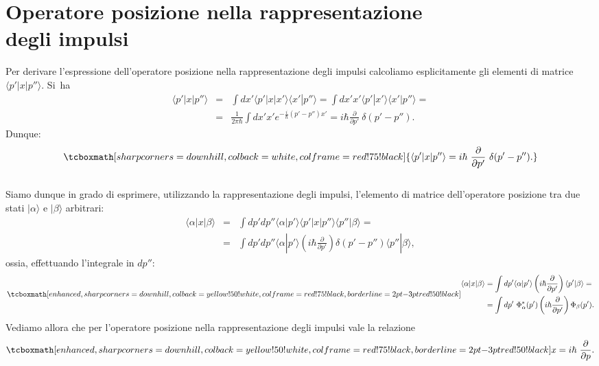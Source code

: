 \documentclass[a4paper,12pt,oneside]{book}
\begin{document}
\section[Operatore posizione nella rappresentazione degli impulsi]{Operatore posizione nella rappresentazione\\degli impulsi}
Per derivare l'espressione dell'operatore posizione nella rappresentazione degli impulsi calcoliamo esplicitamente gli elementi di matrice $\langle p' | x | p'' \rangle$. Si~ha
	\begin{eqnarray}
		\langle p' | x | p'' \rangle &=& \int dx' \langle p' | x | x' \rangle \langle x' | p'' \rangle =  \int dx' x' \langle p' | x' \rangle \langle x' | p'' \rangle = \nonumber\\
		&=& \frac{1}{2 \pi \hbar} \int dx' x' e^{-\frac{i}{\hbar} (p'-p'') x'} =   i \hbar \frac{\partial}{\partial p'} ~\delta(p' - p'').
	\end{eqnarray}
Dunque:
	\begin{equation}
		\tcboxmath[sharp corners=downhill ,colback=white,colframe=red!75!black]{		
			\langle p' | x | p'' \rangle = i \hbar~ \frac{\partial}{\partial p'} ~\delta(p' - p'').
			}
	\end{equation}\\
	
Siamo dunque in grado di esprimere, utilizzando la rappresentazione degli impulsi, l'elemento di matrice dell'operatore posizione tra due stati $| \alpha \rangle$ e $| \beta \rangle$ arbitrari:
	\begin{eqnarray}
		\langle \alpha | x | \beta \rangle &=& \int dp' dp'' \langle \alpha | p' \rangle \langle p' | x | p'' \rangle \langle p'' | \beta \rangle = \nonumber \\
		&=& \int dp' dp'' \langle \alpha | p' \rangle \left(i \hbar \frac{\partial}{\partial p'} \right) \delta(p'-p'') \langle p'' | \beta \rangle,
	\end{eqnarray}
ossia, effettuando l'integrale in $dp''$:
	\begin{equation}
		\tcboxmath[enhanced,sharp corners=downhill ,colback=yellow!50!white,colframe=red!75!black, borderline={2pt}{-3pt}{red!50!black}]{
		\begin{aligned}
			\langle \alpha | x | \beta \rangle &= \int dp' \langle \alpha | p' \rangle \left(i \hbar \frac{\partial}{\partial p'} \right) \langle p' | \beta \rangle = \\
			&= \int dp'~ \Phi ^* _\alpha(p') \left(i \hbar \frac{\partial}{\partial p'} \right) \Phi_\beta(p').
		\end{aligned}
		}
	\end{equation}
Vediamo allora che per l'operatore posizione nella rappresentazione degli impulsi vale la relazione
	\begin{equation}
		\tcboxmath[enhanced,sharp corners=downhill ,colback=yellow!50!white,colframe=red!75!black, borderline={2pt}{-3pt}{red!50!black}]{
			x = i \hbar~ \frac{\partial}{\partial p} .
			}
	\end{equation}
\end{document}
